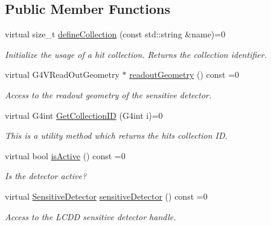 \subsection*{Public Member Functions}
\begin{DoxyCompactItemize}
\item 
virtual size\_\-t \hyperlink{class_d_d4hep_1_1_simulation_1_1_geant4_action_s_d_acb227bd17a6f30d5df564a4d19f3f8a2}{defineCollection} (const std::string \&name)=0
\begin{DoxyCompactList}\small\item\em Initialize the usage of a hit collection. Returns the collection identifier. \item\end{DoxyCompactList}\item 
virtual G4VReadOutGeometry $\ast$ \hyperlink{class_d_d4hep_1_1_simulation_1_1_geant4_action_s_d_abf432e0098d25759837ddc2af5dc6c16}{readoutGeometry} () const =0
\begin{DoxyCompactList}\small\item\em Access to the readout geometry of the sensitive detector. \item\end{DoxyCompactList}\item 
virtual G4int \hyperlink{class_d_d4hep_1_1_simulation_1_1_geant4_action_s_d_ac0539610b17b20d10592201b1eb0755d}{GetCollectionID} (G4int i)=0
\begin{DoxyCompactList}\small\item\em This is a utility method which returns the hits collection ID. \item\end{DoxyCompactList}\item 
virtual bool \hyperlink{class_d_d4hep_1_1_simulation_1_1_geant4_action_s_d_a2c3791fc610294f1d3fc9ff6fe0e755f}{isActive} () const =0
\begin{DoxyCompactList}\small\item\em Is the detector active? \item\end{DoxyCompactList}\item 
virtual \hyperlink{class_d_d4hep_1_1_geometry_1_1_sensitive_detector}{SensitiveDetector} \hyperlink{class_d_d4hep_1_1_simulation_1_1_geant4_action_s_d_a8b1e15e8582895a6a7ad9ce4cf169e8e}{sensitiveDetector} () const =0
\begin{DoxyCompactList}\small\item\em Access to the LCDD sensitive detector handle. \item\end{DoxyCompactList}\item 

\end{DoxyCompactItemize}
